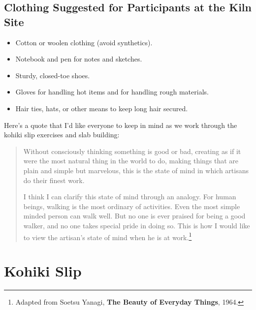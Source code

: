 \documentclass[12pt]{scrartcl}
\begin{document}
\subsection*{Clothing Suggested for Participants at the Kiln Site}
\begin{itemize}
  \item Cotton or woolen clothing (avoid synthetics).
  \item Notebook and pen for notes and sketches.
  \item Sturdy, closed-toe shoes.
  \item Gloves for handling hot items and for handling rough materials.
  \item Hair ties, hats, or other means to keep long hair secured.
\end{itemize}

\clearpage

Here's a quote that I'd like everyone to keep in mind as we work through the kohiki slip exercises and slab building:

{%
\begin{quotation}
  Without consciously thinking something is good or bad, creating as if it were the most natural thing in the world to do, making things that are plain and simple but marvelous, this is the state of mind in which artisans do their finest work.

  I think I can clarify this state of mind through an analogy. For human beings, walking is the most ordinary of activities.  Even the most simple minded person can walk well. But no one is ever praised for being a good walker, and no one takes special pride in doing so.  This is how I would like to view the artisan's state of mind when he is at work.\footnote{Adapted from Soetsu Yanagi, \textbf{The Beauty of Everyday Things}, 1964.}
\end{quotation}%
}
\section*{Kohiki Slip}
\end{document}
